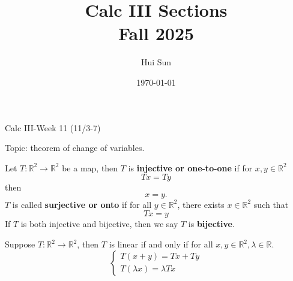 \documentclass[openany]{book}
\title{Calc III Sections
\\ 
\vspace{0.4cm}
\large Fall 2025}
\date{\today}
\author{Hui Sun}
\newcommand{\R}{\mathbb{R}}
\begin{document}
\maketitle

\newpage


\begin{center}
    \Large Calc III-Week 11 (11/3-7)
\end{center}

\renewcommand\thesection{\arabic{section}}

\noindent
Topic: theorem of change of variables.




\begin{defn}
    Let $T:\R^2\to\R^2$ be a map, then $T$ is \textbf{injective or one-to-one} if for $x,y\in\R^2$
    \begin{equation*}
        Tx=Ty
    \end{equation*}
    then
    \begin{equation*}
        x=y.
    \end{equation*}
    $T$ is called \textbf{surjective or onto} if for all $y\in\R^2$, there exists $x\in\R^2$ such that 
    \begin{equation*}
        Tx=y
    \end{equation*}
    If $T$ is both injective and bijective, then we say $T$ is \textbf{bijective}.
\end{defn}

\begin{defn}
    Suppose $T:\R^2\to\R^2$, then $T$ is linear if and only if for all $x,y\in\R^2, \lambda\in\R$.
    \begin{equation*}
        \begin{cases}
            T(x+y)=Tx+Ty\\
            T(\lambda x)=\lambda Tx
        \end{cases}
    \end{equation*}
\end{defn}
\end{document}
